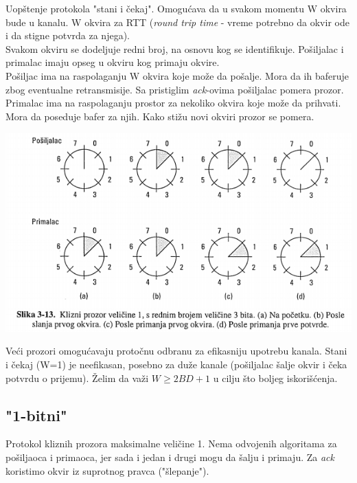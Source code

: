 \documentclass{article} %
\begin{document}
Uop\v{s}tenje protokola "stani i \v{c}ekaj". Omogu\'{c}ava da u svakom momentu W okvira bude u kanalu. W okvira za RTT (\textit{round trip time} - vreme potrebno da okvir ode i da stigne potvrda za njega).\\
Svakom okviru se dodeljuje redni broj, na osnovu kog se identifikuje. Po\v{s}iljalac i primalac imaju opseg u okviru kog primaju okvire.\\
Po\v{s}iljac ima na raspolaganju W okvira koje mo\v{z}e da po\v{s}alje. Mora da ih baferuje zbog eventualne retransmisije. Sa pristiglim \textit{ack}-ovima po\v{s}iljalac pomera prozor.\\
Primalac ima na raspolaganju prostor za nekoliko okvira koje mo\v{z}e da prihvati. Mora da poseduje bafer za njih. Kako sti\v{z}u novi okviri prozor se pomera.\\
\begin{center}
	\includegraphics[scale=0.5]{klizni_prozor}
\end{center}
Ve\'{c}i prozori omogu\'{c}avaju proto\v{c}nu odbranu za efikasniju upotrebu kanala. Stani i \v{c}ekaj (W=1) je neefikasan, posebno za du\v{z}e kanale (po\v{s}iljalac \v{s}alje okvir i \v{c}eka potvrdu o prijemu). \v{Z}elim da va\v{z}i $ W \geq{} 2BD + 1 $ u cilju \v{s}to boljeg iskori\v{s}\'{c}enja.

\subsection{"1-bitni"}

Protokol kliznih prozora maksimalne veli\v{c}ine 1. Nema odvojenih algoritama za po\v{s}iljaoca i primaoca, jer sada i jedan i drugi mogu da \v{s}alju i primaju. Za \textit{ack} koristimo okvir iz suprotnog pravca ("\v{s}lepanje").
\end{document}

